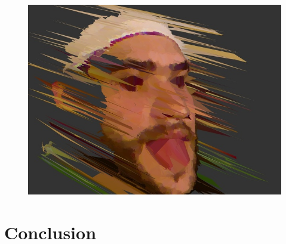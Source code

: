 \documentclass[compress,pdf,11pt,xcolor=dvipsnames]{beamer}
\begin{document}
\begin{frame}{}
\begin{figure}[ht!]
  \begin{center}
    \includegraphics[width=\textwidth]{img/f9_plain}
  \end{center}
\end{figure}


\end{frame}{}


\section{Conclusion}
\end{document}
